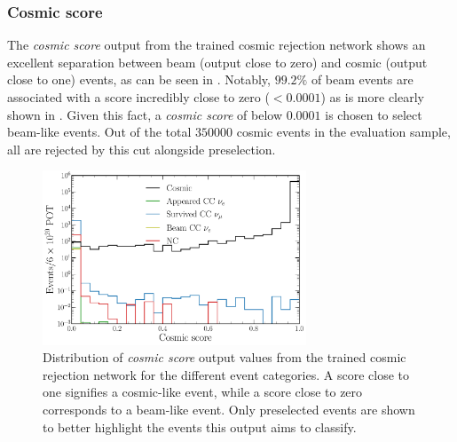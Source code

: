 \subsubsection*{Cosmic score} %

The \emph{cosmic score} output from the trained cosmic rejection network shows an excellent
separation between beam (output close to zero) and cosmic (output close to one) events, as can be
seen in . Notably, $99.2\%$ of beam events are associated with a
score incredibly close to zero ($<0.0001$) as is more clearly shown in
. Given this fact, a \emph{cosmic score} of below $0.0001$ is
chosen to select beam-like events. Out of the total $350000$ cosmic events in the evaluation
sample, all are rejected by this cut alongside preselection.

\begin{figure} %
    \includegraphics[width=0.7\textwidth]{diagrams/7-results/final_cosmic_outputs.pdf}
    \caption[Distribution of cosmic score output values]
    {Distribution of \emph{cosmic score} output values from the trained cosmic rejection network
        for the different event categories. A score close to one signifies a cosmic-like event,
        while a score close to zero corresponds to a beam-like event. Only preselected events are
        shown to better highlight the events this output aims to classify.}
    \label{fig:cosmic_outputs}
\end{figure}

